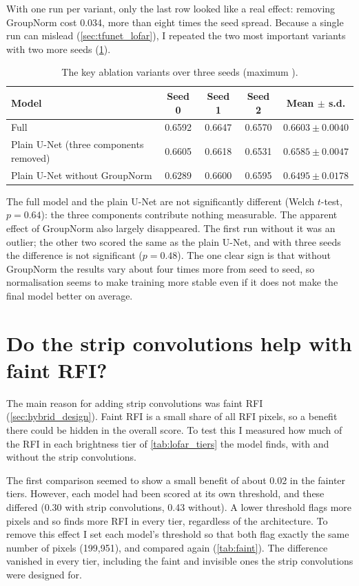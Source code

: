With one run per variant, only the last row looked like a real effect:
removing GroupNorm cost 0.034, more than eight times the seed spread. Because a
single run can mislead (\cref{sec:tfunet_lofar}), I repeated the two most
important variants with two more seeds (\cref{tab:ablation3}).

\begin{table}[H]
  \centering
  \caption{The key ablation variants over three seeds (maximum \Fone{}).}
  \label{tab:ablation3}
  \begin{tabular}{lcccc}
    \toprule
    Model & Seed 0 & Seed 1 & Seed 2 & Mean $\pm$ s.d. \\
    \midrule
    Full \hybrid{}                 & 0.6592 & 0.6647 & 0.6570 & $0.6603 \pm 0.0040$ \\
    Plain U-Net (three components removed) & 0.6605 & 0.6618 & 0.6531 & $0.6585 \pm 0.0047$ \\
    Plain U-Net without GroupNorm  & 0.6289 & 0.6600 & 0.6595 & $0.6495 \pm 0.0178$ \\
    \bottomrule
  \end{tabular}
\end{table}

The full model and the plain U-Net are not significantly different (Welch
$t$-test, $p = 0.64$): the three components contribute nothing measurable. The
apparent effect of GroupNorm also largely disappeared. The first run without it
was an outlier; the other two scored the same as the plain U-Net, and with
three seeds the difference is not significant ($p = 0.48$). The one clear sign
is that without GroupNorm the results vary about four times more from seed to
seed, so normalisation seems to make training more stable even if it does not
make the final model better on average.

\section{Do the strip convolutions help with faint RFI?}
\label{sec:faint}
The main reason for adding strip convolutions was faint RFI
(\cref{sec:hybrid_design}). Faint RFI is a small share of all RFI pixels, so a
benefit there could be hidden in the overall score. To test this I measured how
much of the RFI in each brightness tier of \cref{tab:lofar_tiers} the model
finds, with and without the strip convolutions.

The first comparison seemed to show a small benefit of about 0.02 in the
fainter tiers. However, each model had been scored at its own threshold, and
these differed (0.30 with strip convolutions, 0.43 without). A lower threshold
flags more pixels and so finds more RFI in every tier, regardless of the
architecture. To remove this effect I set each model's threshold so that both
flag exactly the same number of pixels (199{,}951), and compared again
(\cref{tab:faint}). The difference vanished in every tier, including the
faint and invisible ones the strip convolutions were designed for.

